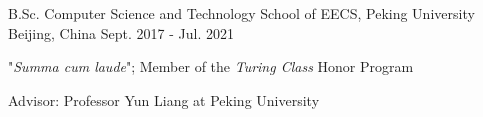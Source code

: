

\begin{cventries}

  \cventry
    {B.Sc. Computer Science and Technology} %
    {School of EECS, Peking University} %
    {Beijing, China} %
    {Sept. 2017 - Jul. 2021} %
    {
      \begin{cvitems} %
      \item {"\emph{Summa cum laude}"; Member of the \emph{Turing Class} Honor Program}
      \item {Advisor: Professor Yun Liang at Peking University}
      \end{cvitems}
    }

\end{cventries}
